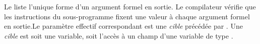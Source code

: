 Le  liste l'unique forme d'un argument formel en sortie. Le compilateur vérifie que les instructions du sous-programme fixent une valeur à chaque argument formel en sortie.Le paramètre effectif correspondant est une \emph{cible} précédée par . Une \emph{cible} est soit une variable, soit l'accès à un champ d'une variable de type .














